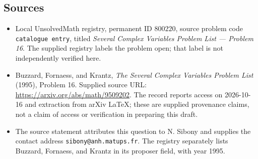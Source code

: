 \documentclass[11pt]{article}
\begin{document}
\subsection{Sources}
\begin{itemize}
\item Local UnsolvedMath registry, permanent ID \(800220\), source problem code \texttt{catalogue entry}, titled \emph{Several Complex Variables Problem List --- Problem 16}. The supplied registry labels the problem open; that label is not independently verified here.
\item Buzzard, Fornaess, and Krantz, \emph{The Several Complex Variables Problem List} (1995), Problem 16. Supplied source URL: \url{https://arxiv.org/abs/math/9509202}. The record reports access on 2026-10-16 and extraction from arXiv LaTeX; these are supplied provenance claims, not a claim of access or verification in preparing this draft.
\item The source statement attributes this question to N. Sibony and supplies the contact address \texttt{sibony@anh.matups.fr}. The registry separately lists Buzzard, Fornaess, and Krantz in its proposer field, with year 1995.
\end{itemize}
\end{document}
